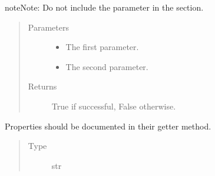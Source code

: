 \documentclass[letterpaper,10pt,english]{sphinxmanual}
\begin{document}
\begin{fulllineitems}
\begin{fulllineitems}
\begin{sphinxadmonition}{note}{Note:}
\sphinxAtStartPar
Do not include the  parameter in the  section.
\end{sphinxadmonition}
\begin{quote}\begin{description}
\item[{Parameters}] \leavevmode\begin{itemize}
\item {} 
\sphinxAtStartPar
{} \textendash{} The first parameter.

\item {} 
\sphinxAtStartPar
{} \textendash{} The second parameter.

\end{itemize}

\item[{Returns}] \leavevmode
\sphinxAtStartPar
True if successful, False otherwise.

\end{description}\end{quote}

\end{fulllineitems}


\begin{fulllineitems}
\label{\detokenize{source/example:example.ExampleClass.readonly_property}}
\pysigstartsignatures
{}
\pysigstopsignatures
\sphinxAtStartPar
Properties should be documented in their getter method.
\begin{quote}\begin{description}
\item[{Type}] \leavevmode
\sphinxAtStartPar
str

\end{description}\end{quote}

\end{fulllineitems}



\end{fulllineitems}
\end{document}
